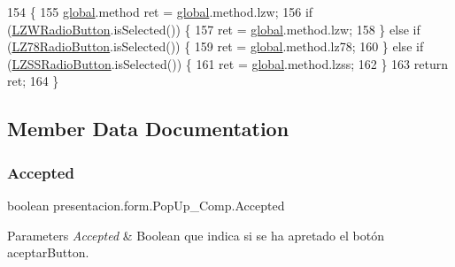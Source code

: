 \begin{DoxyCode}
154                               \{
155         \hyperlink{namespaceglobal}{global}.method ret = \hyperlink{namespaceglobal}{global}.method.lzw;
156         \textcolor{keywordflow}{if} (\hyperlink{classpresentacion_1_1form_1_1PopUp__Comp_a810fe251f9c88e3b83ce466feafafe2e}{LZWRadioButton}.isSelected()) \{
157             ret = \hyperlink{namespaceglobal}{global}.method.lzw;
158         \} \textcolor{keywordflow}{else} \textcolor{keywordflow}{if} (\hyperlink{classpresentacion_1_1form_1_1PopUp__Comp_ac750ecbde516e2fee470693124d2ff63}{LZ78RadioButton}.isSelected()) \{
159             ret = \hyperlink{namespaceglobal}{global}.method.lz78;
160         \} \textcolor{keywordflow}{else} \textcolor{keywordflow}{if} (\hyperlink{classpresentacion_1_1form_1_1PopUp__Comp_ad18c1029f04cc43d033183dca943977c}{LZSSRadioButton}.isSelected()) \{
161             ret = \hyperlink{namespaceglobal}{global}.method.lzss;
162         \}
163         \textcolor{keywordflow}{return} ret;
164     \}
\end{DoxyCode}


\subsection{Member Data Documentation}
\mbox{\label{classpresentacion_1_1form_1_1PopUp__Comp_af8e9310f7ff94d5a8cc917c66536bfde}} 
\subsubsection{\texorpdfstring{Accepted}{Accepted}}
{\footnotesize\ttfamily boolean presentacion.\+form.\+Pop\+Up\+\_\+\+Comp.\+Accepted\hspace{0.3cm}{\ttfamily [private]}}


\begin{DoxyParams}{Parameters}
{\em Accepted} & Boolean que indica si se ha apretado el botón aceptar\+Button. \\
\hline
\end{DoxyParams}
\mbox{\label{classpresentacion_1_1form_1_1PopUp__Comp_a6321172d7f93f607a1cea6e2eee6a6ea}} 
